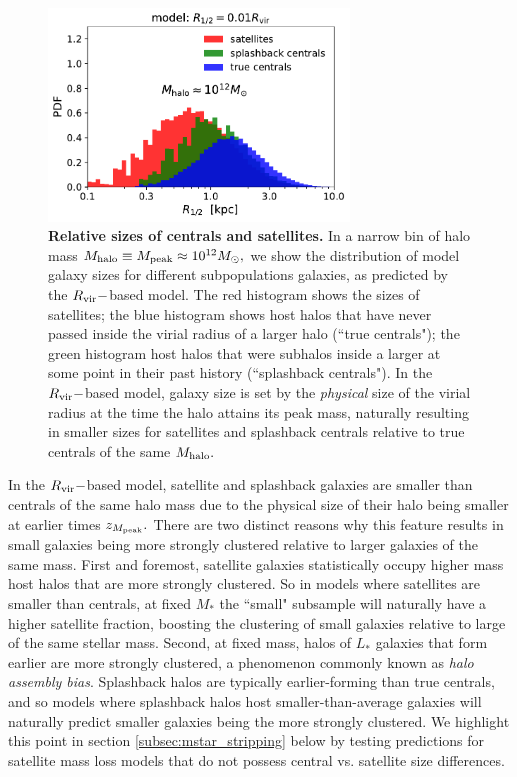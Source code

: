 \documentclass[usenatbib,usegraphicx,letterpaper]{mn2e}
\newcommand{\mstar}{M_{\ast}}
\newcommand{\mpeak}{M_{\rm peak}}
\newcommand{\zpeak}{z_{M_{\rm peak}}}
\newcommand{\mhalo}{M_{\rm halo}}
\newcommand{\rvir}{R_{\rm vir}}
\newcommand{\msun}{M_\odot}
\begin{document}
\begin{figure}
\centering
\includegraphics[width=8cm]{FIGS/rvir_only_cen_sat_sizes.pdf}
\caption{
{\bf Relative sizes of centrals and satellites.}
In a narrow bin of halo mass $\mhalo\equiv\mpeak\approx10^{12}\msun,$ we show the distribution of model galaxy sizes for different subpopulations galaxies, as predicted by the $\rvir-$based model. The red histogram shows the sizes of satellites; the blue histogram shows host halos that have never passed inside the virial radius of a larger halo (``true centrals"); the green histogram host halos that were subhalos inside a larger at some point in their past history (``splashback centrals"). In the $\rvir-$based model, galaxy size is set by the {\em physical} size of the virial radius at the time the halo attains its peak mass, naturally resulting in smaller sizes for satellites and splashback centrals relative to true centrals of the same $\mhalo.$
}
\label{fig:censatsizehist}
\end{figure}

In the $\rvir-$based model, satellite and splashback galaxies are smaller than centrals of the same halo mass due to the physical size of their halo being smaller at earlier times $\zpeak.$ There are two distinct reasons why this feature results in small galaxies being more strongly clustered relative to larger galaxies of the same mass. First and foremost, satellite galaxies statistically occupy higher mass host halos that are more strongly clustered. So in models where satellites are smaller than centrals, at fixed $\mstar$ the ``small" subsample will naturally have a higher satellite fraction, boosting the clustering of small galaxies relative to large of the same stellar mass. Second, at fixed mass, halos of $L_\ast$ galaxies that form earlier are more strongly clustered, a phenomenon commonly known as {\em halo assembly bias}. Splashback halos are typically earlier-forming than true centrals, and so models where splashback halos host smaller-than-average galaxies will naturally predict smaller galaxies being the more strongly clustered. We highlight this point in section \ref{subsec:mstar_stripping} below by testing predictions for satellite mass loss models that do not possess central vs. satellite size differences.
\end{document}
